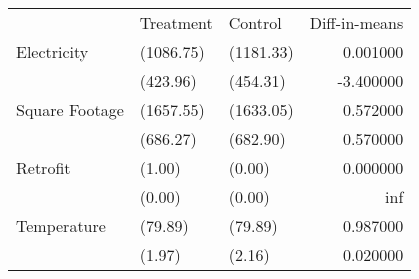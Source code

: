 \begin{tabular}{lllr}
 & Treatment & Control & Diff-in-means \\
Electricity & (1086.75) & (1181.33) & 0.001000 \\
  & (423.96) & (454.31) & -3.400000 \\
Square Footage & (1657.55) & (1633.05) & 0.572000 \\
  & (686.27) & (682.90) & 0.570000 \\
Retrofit & (1.00) & (0.00) & 0.000000 \\
  & (0.00) & (0.00) & inf \\
Temperature & (79.89) & (79.89) & 0.987000 \\
  & (1.97) & (2.16) & 0.020000 \\
\end{tabular}
